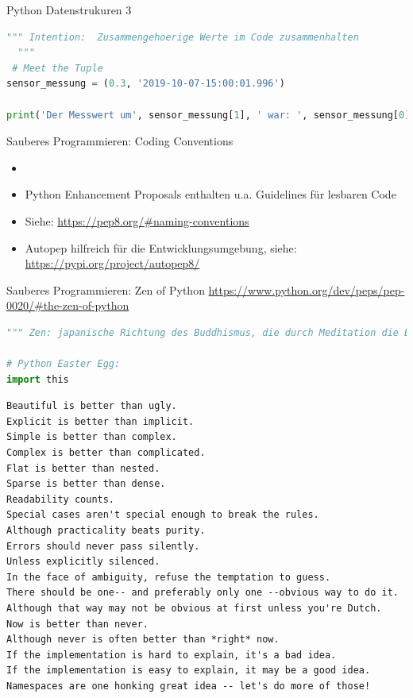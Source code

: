 \begin{frame}[fragile]{Python Datenstrukuren 3}
\begin{lstlisting}[language=Python]
 """ Intention:  Zusammengehoerige Werte im Code zusammenhalten
  """
 # Meet the Tuple
sensor_messung = (0.3, '2019-10-07-15:00:01.996')

print('Der Messwert um', sensor_messung[1], ' war: ', sensor_messung[0])

\end{lstlisting}
\end{frame}


\begin{frame}[fragile]{Sauberes Programmieren: Coding Conventions}
    \begin{itemize}
    \setlength{\itemindent}{.5in}
     \item [\textbf{ Richtlinien}]
    \end{itemize}
    \begin{itemize}
        \item Python Enhancement Proposals enthalten u.a. Guidelines für lesbaren Code
        \item Siehe: \url{https://pep8.org/#naming-conventions}
        \item Autopep hilfreich für die Entwicklungsumgebung, siehe:  \url{https://pypi.org/project/autopep8/}
     \end{itemize}
\end{frame}



\begin{frame}[fragile]{Sauberes Programmieren: Zen of Python}
\url{https://www.python.org/dev/peps/pep-0020/#the-zen-of-python}
\begin{lstlisting}[language=Python]
""" Zen: japanische Richtung des Buddhismus, die durch Meditation die Erfahrung der Einheit allen Seins und damit tätige Lebenskraft und größte Selbstbeherrschung zu erreichen sucht. """

# Python Easter Egg:
import this
\end{lstlisting}
\begin{lstlisting}
Beautiful is better than ugly.
Explicit is better than implicit.
Simple is better than complex.
Complex is better than complicated.
Flat is better than nested.
Sparse is better than dense.
Readability counts.
Special cases aren't special enough to break the rules.
Although practicality beats purity.
Errors should never pass silently.
Unless explicitly silenced.
In the face of ambiguity, refuse the temptation to guess.
There should be one-- and preferably only one --obvious way to do it.
Although that way may not be obvious at first unless you're Dutch.
Now is better than never.
Although never is often better than *right* now.
If the implementation is hard to explain, it's a bad idea.
If the implementation is easy to explain, it may be a good idea.
Namespaces are one honking great idea -- let's do more of those!
\end{lstlisting}
\end{frame}


